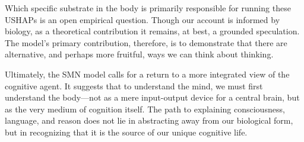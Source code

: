 Which specific substrate in the body is primarily responsible for running these USHAPs is an open empirical question. Though our account is informed by biology, as a theoretical contribution it remains, at best, a grounded speculation. The model's primary contribution, therefore, is to demonstrate that there are alternative, and perhaps more fruitful, ways we can think about thinking.

Ultimately, the SMN model calls for a return to a more integrated view of the cognitive agent. It suggests that to understand the mind, we must first understand the body—not as a mere input-output device for a central brain, but as the very medium of cognition itself. The path to explaining consciousness, language, and reason does not lie in abstracting away from our biological form, but in recognizing that it is the source of our unique cognitive life.
